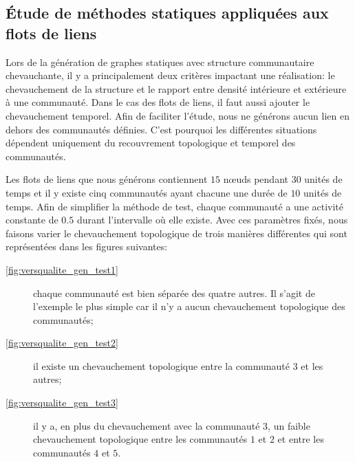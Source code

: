 %



\subsection{Étude de méthodes statiques appliquées aux flots de liens}
\label{sec:versqualite_statique}

Lors de la génération de graphes statiques avec structure communautaire chevauchante, il y a principalement deux critères impactant une réalisation: le chevauchement de la structure et le rapport entre densité intérieure et extérieure à une communauté.
Dans le cas des flots de liens, il faut aussi ajouter le chevauchement temporel.
Afin de faciliter l'étude, nous ne générons aucun lien en dehors des communautés définies.
C'est pourquoi les différentes situations dépendent uniquement du recouvrement topologique et temporel des communautés.
 
Les flots de liens que nous générons contiennent $15$ n\oe uds pendant $30$ unités de temps et il y existe cinq communautés ayant chacune une durée de $10$ unités de temps.
Afin de simplifier la méthode de test, chaque communauté a une activité constante de $0.5$ durant l'intervalle où elle existe.
Avec ces paramètres fixés, nous faisons varier le chevauchement topologique de trois manières différentes qui sont représentées dans les figures suivantes:

\begin{description}
\item[\ref{fig:versqualite_gen_test1}] chaque communauté est bien séparée des quatre autres. Il s'agit de l'exemple le plus simple car il n'y a aucun chevauchement topologique des communautés;
\item[\ref{fig:versqualite_gen_test2}] il existe un chevauchement topologique entre la communauté $3$ et les autres;
\item[\ref{fig:versqualite_gen_test3}] il y a, en plus du chevauchement avec la communauté $3$, un faible chevauchement topologique entre les communautés $1$ et $2$ et entre les communautés $4$ et $5$.
\end{description}


